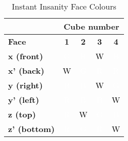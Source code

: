 \documentclass[preview, border=2mm]{standalone}
\newcommand{\R}{\cellcolor{red}\textcolor{white}{R}}
\newcommand{\B}{\cellcolor{blue}\textcolor{white}{B}}
\newcommand{\G}{\cellcolor{green}\textcolor{white}{G}}
\newcommand{\W}{\cellcolor{white}\textcolor{black}{W}}
\begin{document}
{\sffamily\everymath{\sf}

\vspace*{\fill}

\begin{table}[h]
\centering

\begin{tabular}{l|c|c|c|c}
\multicolumn{1}{c|}{} & \multicolumn{4}{c}{\textbf{Cube number}} \\
\hline
\textbf{Face} & \textbf{1} & \textbf{2} & \textbf{3} & \textbf{4} \\
\hline
\textbf{x (front)}     & \G & \R & \W & \B \\
\textbf{x' (back)}     & \W & \G & \R & \R \\
\hline
\textbf{y (right)}     & \B & \B & \W & \G \\
\textbf{y' (left)}     & \R & \B & \B & \W \\
\hline
\textbf{z (top)}       & \R & \W & \G & \B \\
\textbf{z' (bottom)}   & \R & \G & \R & \W \\
\end{tabular}

\caption*{{\sffamily Instant Insanity Face Colours}}

\end{table}

\vspace*{\fill}

}
\end{document}
